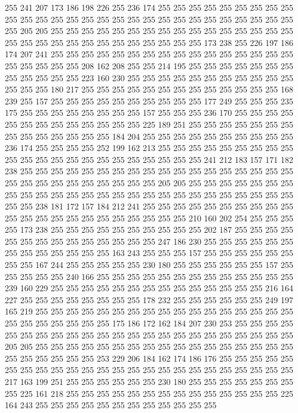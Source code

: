 255 241 207 173 186 198 226 255 236 174 255 255 255 255 255 255 255 255 255 255
255 255 255 255 255 255 255 255 255 255 255 255 255 255 255 255 255 255 255 205
205 255 255 255 255 255 255 255 255 255 255 255 255 255 255 255 255 255 255 255
255 255 255 255 255 255 255 255 255 255 173 238 255 226 197 186 174 207 241 255
255 255 255 255 255 255 255 255 255 255 255 255 255 255 255 255 255 255 255 255
208 162 208 255 255 214 195 255 255 255 255 255 255 255 255 255 255 255 255 223
160 230 255 255 255 255 255 255 255 255 255 255 255 255 255 255 180 217 255 255
255 255 255 255 255 255 255 255 255 255 255 168 239 255 157 255 255 255 255 255
255 255 255 255 255 177 249 255 255 255 235 175 255 255 255 255 255 255 255 255
157 255 255 255 236 170 255 255 255 255 255 255 255 255 255 255 255 255 255 225
189 251 255 255 255 255 255 255 255 255 255 255 255 255 255 255 184 204 255 255
255 255 255 255 255 255 255 255 236 174 255 255 255 255 252 199 162 213 255 255
255 255 255 255 255 255 255 255 255 255 255 255 255 255 255 255 255 255 255 255
241 212 183 157 171 182 238 255 255 255 255 255 255 255 255 255 255 255 255 255
255 255 255 255 255 255 255 255 255 255 255 255 255 255 255 205 205 255 255 255
255 255 255 255 255 255 255 255 255 255 255 255 255 255 255 255 255 255 255 255
255 255 255 255 255 238 181 172 157 184 212 241 255 255 255 255 255 255 255 255
255 255 255 255 255 255 255 255 255 255 255 255 255 255 210 160 202 254 255 255
255 255 173 238 255 255 255 255 255 255 255 255 255 255 202 187 255 255 255 255
255 255 255 255 255 255 255 255 255 255 247 186 230 255 255 255 255 255 255 255
255 255 255 255 255 255 163 243 255 255 255 157 255 255 255 255 255 255 255 255
167 244 255 255 255 255 255 230 180 255 255 255 255 255 255 157 255 255 255 255
255 240 166 255 255 255 255 255 255 255 255 255 255 255 255 255 239 160 229 255
255 255 255 255 255 255 255 255 255 255 255 255 255 216 164 227 255 255 255 255
255 255 255 255 178 232 255 255 255 255 255 255 249 197 165 219 255 255 255 255
255 255 255 255 255 255 255 255 255 255 255 255 255 255 255 255 255 255 255 255
175 186 172 162 184 207 230 253 255 255 255 255 255 255 255 255 255 255 255 255
255 255 255 255 255 255 255 255 255 255 255 205 205 255 255 255 255 255 255 255
255 255 255 255 255 255 255 255 255 255 255 255 255 255 255 255 253 229 206 184
162 174 186 176 255 255 255 255 255 255 255 255 255 255 255 255 255 255 255 255
255 255 255 255 255 255 255 255 217 163 199 251 255 255 255 255 255 255 230 180
255 255 255 255 255 255 255 255 225 161 218 255 255 255 255 255 255 255 255 255
255 255 255 255 255 225 164 243 255 255 255 255 255 255 255 255 255 255 255 255
